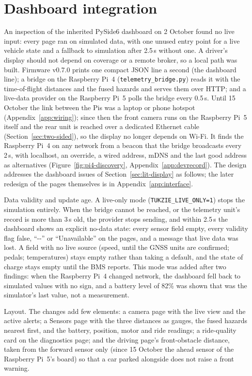 \section{Dashboard integration}
\label{sec:impl-dash}

An inspection of the inherited PySide6 dashboard on 2 October found no live input: every page ran on simulated data, with one unused entry point for a live vehicle state and a fallback to simulation after 2.5\,s without one. A driver's display should not depend on coverage or a remote broker, so a local path was built. Firmware v0.7.0 prints one compact JSON line a second (the dashboard line); a bridge on the Raspberry Pi~4 (\texttt{telemetry\_bridge.py}) reads it with the time-of-flight distances and the fused hazards and serves them over HTTP; and a live-data provider on the Raspberry Pi~5 polls the bridge every 0.5\,s. Until 15 October the link between the Pis was a laptop or phone hotspot (Appendix~\ref{app:wiring}); since then the front camera runs on the Raspberry Pi~5 itself and the rear unit is reached over a dedicated Ethernet cable (Section~\ref{sec:two-sided}), so the display no longer depends on Wi-Fi. It finds the Raspberry Pi~4 on any network from a beacon that the bridge broadcasts every 2\,s, with localhost, an override, a wired address, mDNS and the last good address as alternatives (Figure~\ref{fig:pi4-discovery}, Appendix~\ref{app:devrecord}). The design addresses the dashboard issues of Section~\ref{sec:lit-display} as follows; the later redesign of the pages themselves is in Appendix~\ref{app:interface}.

Data validity and update age. A live-only mode (\texttt{TUKZIE\_LIVE\_ONLY=1}) stops the simulation entirely. When the bridge cannot be reached, or the telemetry unit's record is more than 3\,s old, the provider stops sending, and within 2.5\,s the dashboard shows an explicit no-data state: every sensor field empty, every validity flag false, ``-{}-'' or ``Unavailable'' on the pages, and a message that live data was lost. A field with no live source (speed, until the GNSS units are confirmed; pedals; temperatures) stays empty rather than taking a default, and the state of charge stays empty until the BMS reports. This mode was added after two findings: when the Raspberry Pi~4 changed network, the dashboard fell back to simulated values with no sign, and a battery level of 82\% was shown that was the simulator's last value, not a measurement.

Layout. The changes add few elements: a camera page with the live view and the active alerts; a Sensors page with the three distances as gauges, the fused hazards nearest first, and the battery, position, motor and ride readings; a ride-quality card on the diagnostics page; and the driving page's front-obstacle distance, taken from the forward sensor only (since 15 October the ahead sensor of the Raspberry Pi~5's board) so that a car parked alongside does not raise a front warning.

